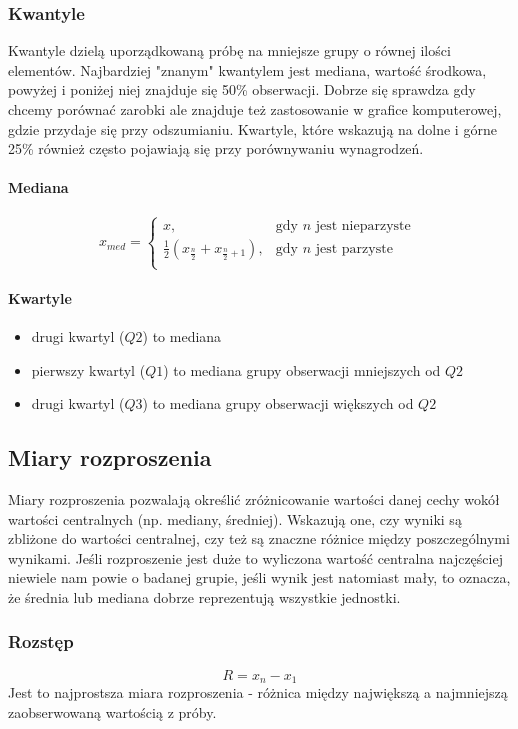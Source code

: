 \documentclass{article}
\theoremstyle{break}
\begin{document}
	\subsubsection{Kwantyle}
	Kwantyle dzielą uporządkowaną próbę na mniejsze grupy o równej ilości elementów. Najbardziej "znanym" kwantylem jest mediana, wartość środkowa, powyżej i poniżej niej znajduje się 50\% obserwacji. Dobrze się sprawdza gdy chcemy porównać zarobki ale znajduje też zastosowanie w grafice komputerowej, gdzie przydaje się przy odszumianiu. Kwartyle, które wskazują na dolne i górne 25\% również często pojawiają się przy porównywaniu wynagrodzeń.
	\paragraph{Mediana}
	$$x_{med}=
	\begin{cases}
		x, &  \text{gdy $n$ jest nieparzyste }\\
		\frac{1}{2}(x_{\frac{n}{2}}+x_{\frac{n}{2}+1}), &  \text{gdy $n$ jest parzyste}\\
	\end{cases}$$
	\paragraph{Kwartyle}
	\begin{itemize}
		\item drugi kwartyl ($Q2$) to mediana
		\item pierwszy kwartyl ($Q1$) to mediana grupy obserwacji mniejszych od $Q2$
		\item drugi kwartyl ($Q3$) to mediana grupy obserwacji większych od $Q2$
	\end{itemize}
	
	\subsection{Miary rozproszenia}
	
	Miary rozproszenia pozwalają określić zróżnicowanie wartości danej cechy wokół wartości centralnych (np. mediany, średniej).  Wskazują one, czy wyniki są zbliżone do wartości centralnej, czy też są znaczne różnice między poszczególnymi wynikami. Jeśli rozproszenie jest duże to wyliczona wartość centralna najczęściej niewiele nam powie o badanej grupie, jeśli wynik jest natomiast mały, to oznacza, że średnia lub mediana dobrze reprezentują wszystkie jednostki.
	
	\subsubsection{Rozstęp}
	$$R=x_n-x_1$$
	Jest to najprostsza miara rozproszenia - różnica między największą a najmniejszą zaobserwowaną wartością z próby. 
\end{document}
